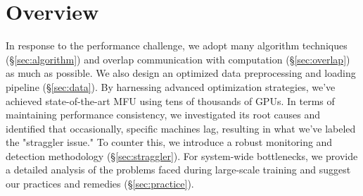 \section{Overview}
In response to the performance challenge, we adopt many algorithm techniques (\S\ref{sec:algorithm}) and overlap communication with computation (\S\ref{sec:overlap}) as much as possible. We also design an optimized data preprocessing and loading pipeline (\S\ref{sec:data}). By harnessing advanced optimization strategies, we've achieved state-of-the-art MFU using tens of thousands of GPUs. In terms of maintaining performance consistency, we investigated its root causes and identified that occasionally, specific machines lag, resulting in what we've labeled the "straggler issue." To counter this, we introduce a robust monitoring and detection methodology (\S\ref{sec:straggler}). For system-wide bottlenecks, we provide a detailed analysis of the problems faced during large-scale training and suggest our practices and remedies (\S\ref{sec:practice}).

